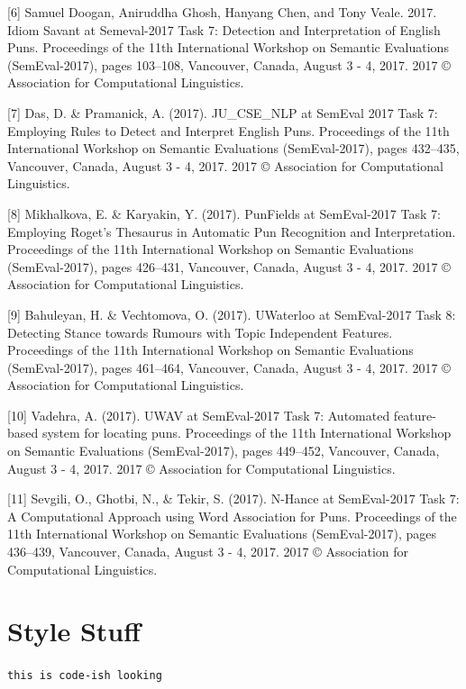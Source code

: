 \documentclass{article}
\begin{document}
[6] Samuel Doogan, Aniruddha Ghosh, Hanyang Chen, and Tony Veale. 2017. Idiom
Savant at Semeval-2017 Task 7: Detection and Interpretation of English Puns.
Proceedings of the 11th International Workshop on Semantic Evaluations
(SemEval-2017), pages 103–108, Vancouver, Canada, August 3 - 4, 2017. 2017 ©
Association for Computational Linguistics.

[7] Das, D. \& Pramanick, A. (2017). JU\_CSE\_NLP at SemEval 2017 Task 7:
Employing Rules to Detect and Interpret English Puns. Proceedings of the 11th
International Workshop on Semantic Evaluations (SemEval-2017), pages 432–435,
Vancouver, Canada, August 3 - 4, 2017. 2017 © Association for Computational
Linguistics.

[8] Mikhalkova, E. \& Karyakin, Y. (2017). PunFields at SemEval-2017 Task 7:
Employing Roget’s Thesaurus in Automatic Pun Recognition and Interpretation.
Proceedings of the 11th International Workshop on Semantic Evaluations
(SemEval-2017), pages 426–431, Vancouver, Canada, August 3 - 4, 2017. 2017 ©
Association for Computational Linguistics.

[9] Bahuleyan, H. \& Vechtomova, O. (2017). UWaterloo at SemEval-2017 Task 8:
Detecting Stance towards Rumours with Topic Independent Features. Proceedings
of the 11th International Workshop on Semantic Evaluations (SemEval-2017),
pages 461–464, Vancouver, Canada, August 3 - 4, 2017. 2017 © Association for
Computational Linguistics.

[10] Vadehra, A. (2017). UWAV at SemEval-2017 Task 7: Automated feature-based
system for locating puns. Proceedings of the 11th International Workshop on
Semantic Evaluations (SemEval-2017), pages 449–452, Vancouver, Canada, August 3
- 4, 2017. 2017 © Association for Computational Linguistics.

[11] Sevgili, O., Ghotbi, N., \& Tekir, S. (2017). N-Hance at SemEval-2017 Task
7: A Computational Approach using Word Association for Puns. Proceedings of the
11th International Workshop on Semantic Evaluations (SemEval-2017), pages
436–439, Vancouver, Canada, August 3 - 4, 2017. 2017 © Association for
Computational Linguistics.

\section{Style Stuff}
\verb+this is code-ish looking+ 
\end{document}
